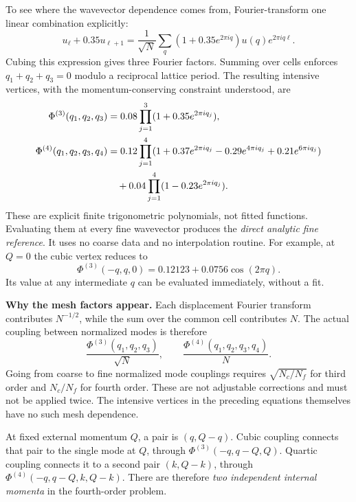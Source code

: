 \documentclass[11pt,a4paper]{article}
\begin{document}
To see where the wavevector dependence comes from, Fourier-transform one
linear combination explicitly:
\begin{equation}
 u_\ell+0.35u_{\ell+1}
 =\frac1{\sqrt N}\sum_q
       (1+0.35e^{2\pi iq})u(q)e^{2\pi iq\ell}.
\end{equation}
Cubing this expression gives three Fourier factors. Summing over cells enforces
$q_1+q_2+q_3=0$ modulo a reciprocal lattice period. The resulting intensive
vertices, with the momentum-conserving constraint understood, are
\begin{align}
 \Phi^{(3)}(q_1,q_2,q_3)
 &=0.08\prod_{j=1}^{3}(1+0.35e^{2\pi iq_j}),\\
 \Phi^{(4)}(q_1,q_2,q_3,q_4)
 &=0.12\prod_{j=1}^{4}
   (1+0.37e^{2\pi iq_j}-0.29e^{4\pi iq_j}+0.21e^{6\pi iq_j})\notag\\
 &\quad+0.04\prod_{j=1}^{4}(1-0.23e^{2\pi iq_j}).
\end{align}
These are explicit finite trigonometric polynomials, not fitted functions.
Evaluating them at every fine wavevector produces the \emph{direct analytic
fine reference}. It uses no coarse data and no interpolation routine.
For example, at $Q=0$ the cubic vertex reduces to
\begin{equation}
 \Phi^{(3)}(-q,q,0)=0.12123+0.0756\cos(2\pi q).
\end{equation}
Its value at any intermediate $q$ can be evaluated immediately, without a fit.

\textbf{Why the mesh factors appear.} Each displacement Fourier transform
contributes $N^{-1/2}$, while the sum over the common cell contributes $N$.
The actual coupling between normalized modes is therefore
\begin{equation}
 \frac{\Phi^{(3)}(q_1,q_2,q_3)}{\sqrt N},
 \qquad
 \frac{\Phi^{(4)}(q_1,q_2,q_3,q_4)}{N}.
\end{equation}
Going from coarse to fine normalized mode couplings requires
$\sqrt{N_c/N_f}$ for third order and $N_c/N_f$ for fourth order. These are not
adjustable corrections and must not be applied twice. The intensive vertices
in the preceding equations themselves have no such mesh dependence.

At fixed external momentum $Q$, a pair is $(q,Q-q)$. Cubic coupling connects
that pair to the single mode at $Q$, through
$\Phi^{(3)}(-q,q-Q,Q)$. Quartic coupling connects it to a second pair
$(k,Q-k)$, through $\Phi^{(4)}(-q,q-Q,k,Q-k)$. There are therefore
\emph{two independent internal momenta} in the fourth-order problem.
\end{document}
